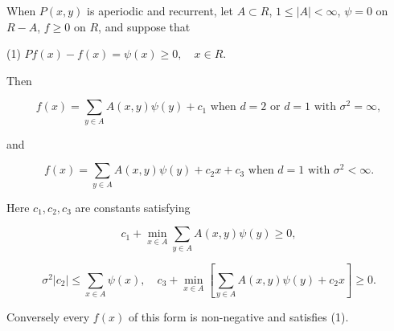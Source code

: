 When $P(x,y)$ is aperiodic and recurrent, let $A \subset R$, $1 \leq |A| < \infty$, $\psi = 0$ on $R - A$, $f \geq 0$ on $R$, and suppose that

(1) $Pf(x) - f(x) = \psi(x) \geq 0, \quad x \in R.$

Then

$$f(x) = \sum_{y \in A} A(x,y)\psi(y) + c_1 \text{ when } d = 2 \text{ or } d = 1 \text{ with } \sigma^2 = \infty,$$

and

$$f(x) = \sum_{y \in A} A(x,y)\psi(y) + c_2x + c_3 \text{ when } d = 1 \text{ with } \sigma^2 < \infty.$$

Here $c_1, c_2, c_3$ are constants satisfying

$$c_1 + \min_{x \in A} \sum_{y \in A} A(x,y)\psi(y) \geq 0,$$

$$\sigma^2 |c_2| \leq \sum_{x \in A} \psi(x), \quad c_3 + \min_{x \in A} \left[ \sum_{y \in A} A(x,y)\psi(y) + c_2x \right] \geq 0.$$

Conversely every $f(x)$ of this form is non-negative and satisfies (1).